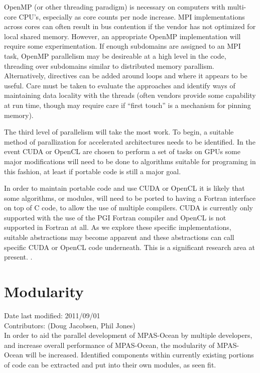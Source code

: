 \documentclass[11pt]{report}
\begin{document}
OpenMP (or other threading paradigm) is necessary on computers with multi-core CPU's, especially as core counts per node increase.  MPI implementations across cores can often result in bus contention if the vendor has not optimized for local shared memory. However, an appropriate OpenMP implementation will require some experimentation.  If enough subdomains are assigned to an MPI task, OpenMP parallelism may be desireable at a high level in the code, threading over subdomains similar to distributed memory parallism.  Alternatively, directives can be added around loops and where it appears to be useful. Care must be taken to evaluate the approaches and identify ways of maintaining data locality with the threads (often vendors provide some capability at run time, though may require care if ``first touch'' is a mechanism for pinning memory).  

The third level of parallelism will take the most work. To begin, a suitable method of parallization for accelerated architectures needs to be identified. In the event CUDA or OpenCL are chosen to perform a set of tasks on GPUs some major modifications will need to be done to algorithms suitable for programing in this fashion, at least if portable code is still a major goal. 

In order to maintain portable code and use CUDA or OpenCL it is likely that some algorithms, or modules, will need to be ported to having a Fortran interface on top of C code, to allow the use of multiple compilers. CUDA is currently only supported with the use of the PGI Fortran compiler and OpenCL is not supported in Fortran at all. As we explore these specific implementations, suitable abstractions may become apparent and these abstractions can call specific CUDA or OpenCL code underneath.  This is a significant research area at present. 
.


\FloatBarrier
\section{Modularity}
Date last modified: 2011/09/01 \\
Contributors: (Doug Jacobsen, Phil Jones) \\

In order to aid the parallel development of MPAS-Ocean by multiple developers, and increase overall performance of MPAS-Ocean, the modularity of MPAS-Ocean will be increased. Identified components within currently existing portions of code can be extracted and put into their own modules, as seen fit.
\end{document}
